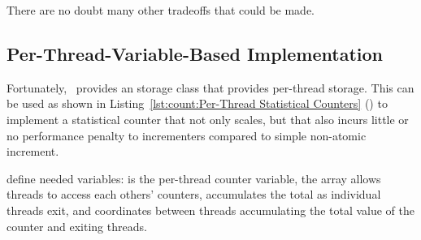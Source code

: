 {{	There are no doubt many other tradeoffs that could be made.
}\QuickQuizEndM
%
\QuickQuizEndE
}

\subsection{Per-Thread-Variable-Based Implementation}
\label{sec:count:Per-Thread-Variable-Based Implementation}

Fortunately, \GCC\ provides an  storage class that provides
per-thread storage.
This can be used as shown in
Listing~\ref{lst:count:Per-Thread Statistical Counters} ()
to implement
a statistical counter that not only scales, but that also incurs little
or no performance penalty to incrementers compared to simple non-atomic
increment.

\begin{listing}[tb]

\caption{Per-Thread Statistical Counters}
\label{lst:count:Per-Thread Statistical Counters}
\end{listing}

\begin{fcvref}
 define needed variables:
 is the per-thread counter
variable, the  array allows threads to access each others'
counters,  accumulates the total as individual threads exit,
and  coordinates between threads accumulating the total
value of the counter and exiting threads.
\end{fcvref}

